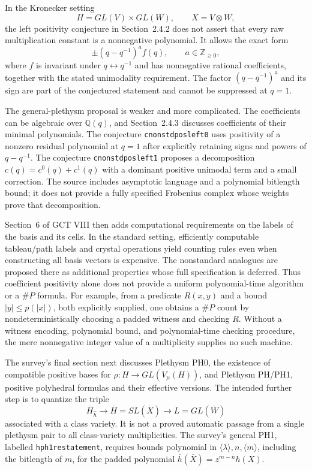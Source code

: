In the Kronecker setting
\[
 H=GL(V)\times GL(W),\qquad X=V\otimes W,
\]
the left positivity conjecture in Section~2.4.2 does not assert that
every raw multiplication constant is a nonnegative polynomial.  It allows
the exact form
\begin{equation}\label{eq:gct-nrh-signed-positivity}
 \pm(q-q^{-1})^a f(q),\qquad a\in\mathbb Z_{\ge0},
\end{equation}
where $f$ is invariant under $q\leftrightarrow q^{-1}$ and has
nonnegative rational coefficients, together with the stated unimodality
requirement.  The factor $(q-q^{-1})^a$ and its sign are part of the
conjectured statement and cannot be suppressed at $q=1$.

The general-plethysm proposal is weaker and more complicated.  The
coefficients can be algebraic over $\mathbb Q(q)$, and Section~2.4.3
discusses coefficients of their minimal polynomials.  The conjecture
\texttt{cnonstdposleft0} uses positivity of a nonzero residual polynomial
at $q=1$ after explicitly retaining signs and powers of $q-q^{-1}$.
The conjecture \texttt{cnonstdposleft1} proposes a decomposition
$c(q)=c^0(q)+c^1(q)$ with a dominant positive unimodal term and a small
correction.  The source includes asymptotic language and a polynomial
bitlength bound; it does not provide a fully specified Frobenius complex
whose weights prove that decomposition.

Section~6 of GCT VIII then adds computational requirements on the labels
of the basis and its cells.  In the standard setting, efficiently
computable tableau/path labels and crystal operations yield counting
rules even when constructing all basis vectors is expensive.  The
nonstandard analogues are proposed there as additional properties whose
full specification is deferred.  Thus coefficient positivity alone
does not provide a uniform polynomial-time algorithm or a $\#P$ formula.
For example, from a predicate $R(x,y)$ and a bound $|y|\le p(|x|)$, both
explicitly supplied, one obtains a $\#P$ count by nondeterministically
choosing a padded witness and checking $R$.  Without a witness encoding,
polynomial bound, and polynomial-time checking procedure, the mere
nonnegative integer value of a multiplicity supplies no such machine.

The survey's final section next discusses Plethysm PH0, the existence
of compatible positive bases for $\rho:H\to GL(V_\mu(H))$, and
Plethysm PH/PH1, positive polyhedral formulas and their effective
versions.  The intended further step is to quantize the triple
\[
 \overline H_{\widehat h}\longrightarrow
 \overline H=SL(\overline X)\longrightarrow L=GL(\overline W)
\]
associated with a class variety.  It is not a proved automatic passage
from a single plethysm pair to all class-variety multiplicities.
The survey's general PH1, labelled \texttt{hph1restatement}, requires
bounds polynomial in $\langle\lambda\rangle,n,\langle m\rangle$,
including the bitlength of $m$, for the padded polynomial
$\overline h(\overline X)=z^{m-n}h(X)$.

